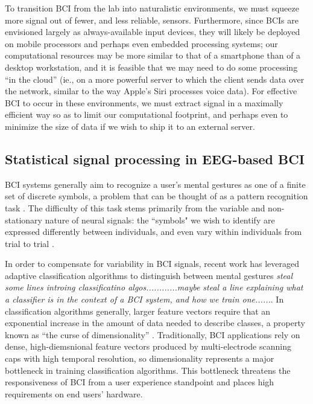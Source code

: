 To transition BCI from the lab into naturalistic environments, we must squeeze more signal out of fewer, and less reliable, sensors. Furthermore, since BCIs are envisioned largely as always-available input devices, they will likely be deployed on mobile processors and perhaps even embedded processing systems; our computational resources may be more similar to that of a smartphone than of a desktop workstation, and it is feasible that we may need to do some processing ``in the cloud'' (ie., on a more powerful server to which the client sends data over the network, similar to the way Apple's Siri processes voice data). For effective BCI to occur in these environments, we must extract signal in a maximally efficient way so as to limit our computational footprint, and perhaps even to minimize the size of data if we wish to ship it to an external server.

\subsection{Statistical signal processing in EEG-based BCI}

\noindent BCI systems generally aim to recognize a user's mental gestures as one of a finite set of discrete symbols, a problem that can be thought of as a pattern recognition task \cite{lotte_review_2007}. The difficulty of this task stems primarily from the variable and non-stationary nature of neural signals: the ``symbols" we wish to identify are expressed differently between individuals, and even vary within individuals from trial to trial \cite{vidaurre_fully_2006,vidaurre_machine-learning-based_2011}. 

In order to compensate for variability in BCI signals, recent work has leveraged adaptive classification algorithms to distinguish between mental gestures \cite{lotte_review_2007,vidaurre_machine-learning-based_2011} \textit{steal some lines introing classificatino algos............maybe steal a line explaining what a classifier is in the context of a BCI system, and how we train one......}.  In classification algorithms generally, larger feature vectors require that an exponential increase in the amount of data needed to describe classes, a property known as ``the curse of dimensionality'' \cite{jain_statistical_2000,raudys_small_1991}. Traditionally, BCI applications rely on dense, high-diemsnional feature vectors produced by multi-electrode scanning caps with high temporal resolution, so dimensionality represents a major bottleneck in training classification algorithms. This bottleneck threatens the responsiveness of BCI from a user experience standpoint and places high requirements on end users' hardware.

